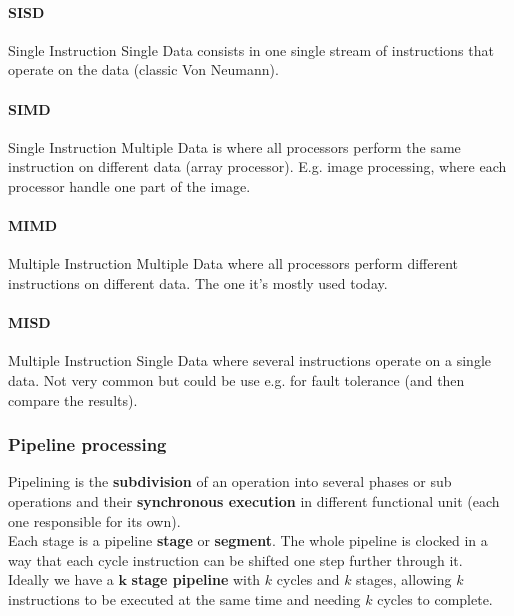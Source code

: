 \paragraph{SISD} Single Instruction Single Data consists in one single stream of instructions that operate on the data (classic Von Neumann).

\paragraph{SIMD} Single Instruction Multiple Data is where all processors perform the same instruction on different data (array processor). E.g. image processing, where each processor handle one part of the image.

\paragraph{MIMD} Multiple Instruction Multiple Data where all processors perform different instructions on different data. The one it's mostly used today.

\paragraph{MISD} Multiple Instruction Single Data where several instructions operate on a single data. Not very common but could be use e.g. for fault tolerance (and then compare the results).

\begin{figure}[!h]
	\hfill
	\hfill
	\hfill
	\hfill
\end{figure}

\subsubsection{Pipeline processing}
Pipelining is the \textbf{subdivision} of an operation into several phases or sub operations and their \textbf{synchronous execution} in different functional unit (each one responsible for its own).\\
Each stage is a pipeline \textbf{stage} or \textbf{segment}. The whole pipeline is clocked in a way that each cycle instruction can be shifted one step further through it.\\
Ideally we have a $\mathbf{k}$ \textbf{stage pipeline} with $k$ cycles and $k$ stages, allowing $k$ instructions to be executed at the same time and needing $k$ cycles to complete.

